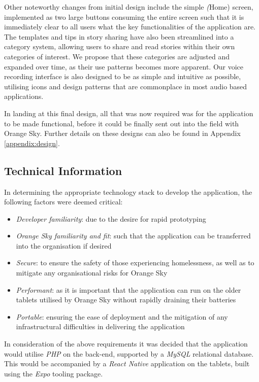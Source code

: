 Other noteworthy changes from initial design include the simple \emph(Home) screen, implemented as two large buttons consuming the entire screen such that it is immediately clear to all users what the key functionalities of the application are. The templates and tips in story sharing have also been streamlined into a category system, allowing users to share and read stories within their own categories of interest. We propose that these categories are adjusted and expanded over time, as their use patterns becomes more apparent. Our voice recording interface is also designed to be as simple and intuitive as possible, utilising icons and design patterns that are commonplace in most audio based applications.

In landing at this final design, all that was now required was for the application to be made functional, before it could be finally sent out into the field with Orange Sky. Further details on these designs can also be found in Appendix \ref{appendix:design}.

\subsection{Technical Information}

In determining the appropriate technology stack to develop the application, the following factors were deemed critical:

\begin{itemize}
    \item \emph{Developer familiarity}: due to the desire for rapid prototyping
    \item \emph{Orange Sky familiarity and fit}: such that the application can be transferred into the organisation if desired
    \item \emph{Secure}: to ensure the safety of those experiencing homelessness, as well as to mitigate any organisational risks for Orange Sky
    \item \emph{Performant}: as it is important that the application can run on the older tablets utilised by Orange Sky without rapidly draining their batteries
    \item \emph{Portable}: ensuring the ease of deployment and the mitigation of any infrastructural difficulties in delivering the application
\end{itemize}

In consideration of the above requirements it was decided that the application would utilise \emph{PHP} on the back-end, supported by a \emph{MySQL} relational database. This would be accompanied by a \emph{React Native} application on the tablets, built using the \emph{Expo} tooling package.

